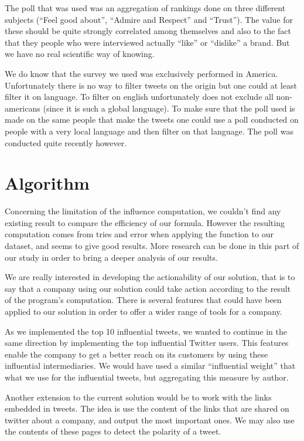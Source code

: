 \documentclass[a4paper,12pt]{report}
\begin{document}
The poll that was used was an aggregation of rankings done on three different subjects (“Feel good about”, “Admire and Respect” and “Trust”). The value for these should be quite strongly correlated among themselves and also to the fact that they people who were interviewed actually “like” or “dislike” a brand. But we have no real scientific way of knowing.

We do know that the survey we used was exclusively performed in America. Unfortunately there is no way to filter tweets on the origin but one could at least filter it on language. To filter on english unfortunately does not exclude all non-americans (since it is such a global language). To make sure that the poll used is made on the same people that make the tweets one could use a poll conducted on people with a very local language and then filter on that language. The poll was conducted quite recently however.

\section{Algorithm}

Concerning the limitation of the influence computation, we couldn't find any existing result to compare the efficiency of our formula. However the resulting computation comes from tries and error when applying the function to our dataset, and seems to give good results. More research can be done in this part of our study in order to bring a deeper analysis of our results.

We are really interested in developing the actionability of our solution, that is to say that a company using our solution could take action according to the result of the program’s computation. There is several features that could have been applied to our solution in order to offer a wider range of tools for a company.

As we implemented the top 10 influential tweets, we wanted to continue in the same direction by implementing the top influential Twitter users. This features enable the company to get a better reach on its customers by using these influential intermediaries. We would have used a similar “influential weight” that what we use for the influential tweets, but aggregating this measure by author.

Another extension to the current solution would be to work with the links embedded in tweets. The idea is use the content of the links that are shared on twitter about a company, and output the most important ones. We may also use the contents of these pages to detect the polarity of a tweet.
\end{document}
